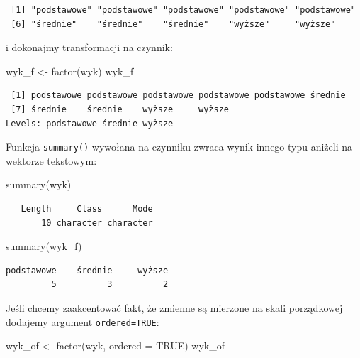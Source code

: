 \documentclass[
  letterpaper,
  DIV=11,
  numbers=noendperiod]{scrreprt}
\newenvironment{Shaded}{\begin{snugshade}}{\end{snugshade}}
\newcommand{\AttributeTok}[1]{\textcolor[rgb]{0.40,0.45,0.13}{#1}}
\newcommand{\ConstantTok}[1]{\textcolor[rgb]{0.56,0.35,0.01}{#1}}
\newcommand{\FunctionTok}[1]{\textcolor[rgb]{0.28,0.35,0.67}{#1}}
\newcommand{\NormalTok}[1]{\textcolor[rgb]{0.00,0.23,0.31}{#1}}
\newcommand{\OtherTok}[1]{\textcolor[rgb]{0.00,0.23,0.31}{#1}}
\begin{document}
\begin{verbatim}
 [1] "podstawowe" "podstawowe" "podstawowe" "podstawowe" "podstawowe"
 [6] "średnie"    "średnie"    "średnie"    "wyższe"     "wyższe"    
\end{verbatim}

i dokonajmy transformacji na czynnik:

\begin{Shaded}
\begin{Highlighting}[]
\NormalTok{wyk\_f }\OtherTok{\textless{}{-}} \FunctionTok{factor}\NormalTok{(wyk)}
\NormalTok{wyk\_f}
\end{Highlighting}
\end{Shaded}

\begin{verbatim}
 [1] podstawowe podstawowe podstawowe podstawowe podstawowe średnie   
 [7] średnie    średnie    wyższe     wyższe    
Levels: podstawowe średnie wyższe
\end{verbatim}

Funkcja \texttt{summary()} wywołana na czynniku zwraca wynik innego typu
aniżeli na wektorze tekstowym:

\begin{Shaded}
\begin{Highlighting}[]
\FunctionTok{summary}\NormalTok{(wyk)}
\end{Highlighting}
\end{Shaded}

\begin{verbatim}
   Length     Class      Mode 
       10 character character 
\end{verbatim}

\begin{Shaded}
\begin{Highlighting}[]
\FunctionTok{summary}\NormalTok{(wyk\_f)}
\end{Highlighting}
\end{Shaded}

\begin{verbatim}
podstawowe    średnie     wyższe 
         5          3          2 
\end{verbatim}

Jeśli chcemy zaakcentować fakt, że zmienne są mierzone na skali
porządkowej dodajemy argument \texttt{ordered=TRUE}:

\begin{Shaded}
\begin{Highlighting}[]
\NormalTok{wyk\_of }\OtherTok{\textless{}{-}} \FunctionTok{factor}\NormalTok{(wyk, }\AttributeTok{ordered =} \ConstantTok{TRUE}\NormalTok{)}
\NormalTok{wyk\_of}
\end{Highlighting}
\end{Shaded}
\end{document}
